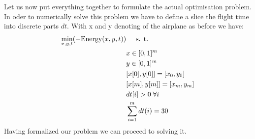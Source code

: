 Let us now put everything together to formulate the actual optimisation problem. In oder to numerically solve this problem we have to define a slice the flight time into discrete parts $dt$. With x and y denoting of the airplane as before we have:
\begin{align}
\min_{x,y,t }( -\text{Energy}(x,y,t)) & \hspace{5mm} \text{s. t. } \\
& x \in [0,1]^m\\
& y \in [0,1]^m\\
& [x[0],y[0]] = [x_0,y_0] \\
& [x[m],y[m]] = [x_m,y_m] \\
& dt[i] > 0 \; \forall i\\
& \sum_{i=1}^m dt(i) = 30 
\end{align}
Having formalized our problem we can proceed to solving it.

